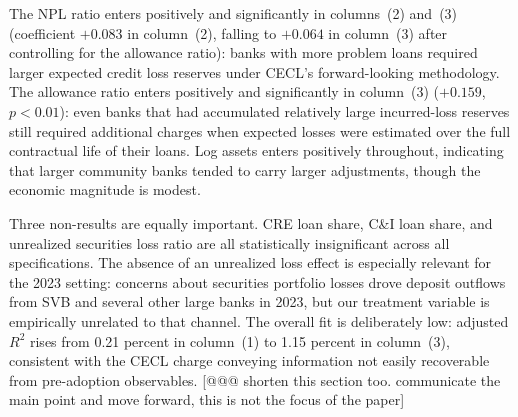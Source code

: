 The NPL ratio enters positively and significantly in columns~(2) and~(3)
(coefficient $+0.083$ in column~(2), falling to $+0.064$ in column~(3) after
controlling for the allowance ratio): banks with more problem loans required
larger expected credit loss reserves under CECL's forward-looking methodology.
The allowance ratio enters positively and significantly in column~(3)
($+0.159$, $p < 0.01$): even banks that had accumulated relatively large
incurred-loss reserves still required additional charges when expected losses
were estimated over the full contractual life of their loans.  Log assets
enters positively throughout, indicating that larger community banks tended to
carry larger adjustments, though the economic magnitude is modest.

Three non-results are equally important.  CRE loan share, C\&I loan share, and
unrealized securities loss ratio are all statistically insignificant across all
specifications.  The absence of an unrealized loss effect is especially relevant
for the 2023 setting: concerns about securities portfolio losses drove deposit
outflows from SVB and several other large banks in 2023, but our treatment
variable is empirically unrelated to that channel.  The overall fit is
deliberately low: adjusted $R^2$ rises from 0.21 percent in column~(1) to
1.15 percent in column~(3), consistent with the CECL charge conveying
information not easily recoverable from pre-adoption observables.
[@@@ shorten this section too. communicate the main point and move forward, this is not the focus of the paper]
